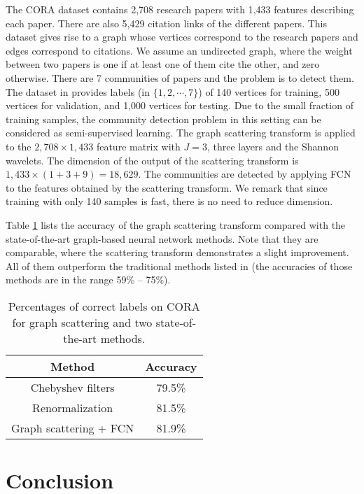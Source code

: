 \documentclass{article}
\begin{document}
The CORA dataset \cite{SenNB08} contains 2,708 research papers with 1,433 features describing each paper. There are also 5,429 citation links of the different papers. 
This dataset gives rise to a graph whose vertices correspond to the research papers and edges correspond to citations. We assume an undirected graph, where the weight between two papers is one if at least one of them cite the other, and zero otherwise. 
There are 7 communities of papers and the problem is to detect them. The dataset in \cite{SenNB08} provides labels {(in $\{1,2,\cdots,7\}$)} of 140 vertices for training, 500 vertices for validation, and 1,000 vertices for testing. Due to the small fraction of training samples, the community detection problem in this setting can be considered as semi-supervised learning. The graph scattering transform is applied to the $2,708 \times 1,433$ feature matrix with $J=3${,} three layers {and the Shannon wavelets. The dimension of the output of the scattering transform is $1,433 \times (1+3+9) = 18,629$.} The communities are detected by applying FCN to the features obtained by the scattering transform. {We remark that since training with only 140 samples is fast, there is no need to reduce dimension.}

Table \ref{tab:cora} lists the accuracy of the graph scattering transform compared with the state-of-the-art graph-based neural network methods. Note that they are comparable, where the scattering transform demonstrates a slight improvement. All of them outperform the traditional methods listed in \cite[Table 2]{KipW16} (the accuracies of those methods are in the range 59\% -- 75\%). 


\begin{table}[!ht]
\centering
\begin{tabular}{|c|c|}
\hline
Method & Accuracy \\
\hline
Chebyshev filters \cite{DefBV16,KipW16} & 79.5\% \\
\hline
Renormalization \cite{KipW16} & 81.5\% \\
\hline
Graph scattering + FCN &  81.9\%  \\
\hline
\end{tabular}
\caption{Percentages of correct labels on CORA for graph scattering and two state-of-the-art methods.}
\label{tab:cora}
\end{table}

\section{Conclusion}
\end{document}
